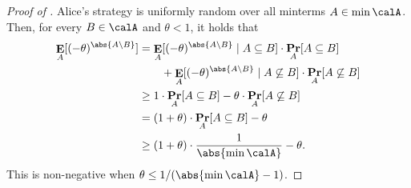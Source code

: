 \documentclass{toc}
\DeclareMathOperator\pr{\mathop{\bf Pr}}
\DeclareMathOperator\E{\mathop{\bf E}}
\begin{document}
\begin{proof}[Proof of ]
Alice's strategy is uniformly random over all minterms $A \in \min\calA$.  
Then, for every $B \in \calA$ and $\theta<1$, it holds that
  \begin{align*}
  \E_A[(-\theta)^{\abs{A \setminus B}}] &= \E_A[(-\theta)^{\abs{A \setminus B}} \mid A\subseteq B]\cdot \pr_A[A\subseteq B] \\ &\qquad + \E_A[(-\theta)^{\abs{A \setminus B}} \mid A\not\subseteq B]\cdot \pr_A[A\not\subseteq B] \\
	& \geq 1 \cdot \pr_A[A \subseteq B] - \theta \cdot
	\pr_A[A \not\subseteq B]\\ 
	& = (1+\theta)\cdot \pr_A[A \subseteq B] - \theta \\
	& \geq (1+\theta)\cdot \frac{1}{\abs{\min\calA}} - \theta.
	\end{align*}
This is non-negative when $\theta \leq 1/(\abs{\min\calA} - 1)$.
\end{proof}
\end{document}

